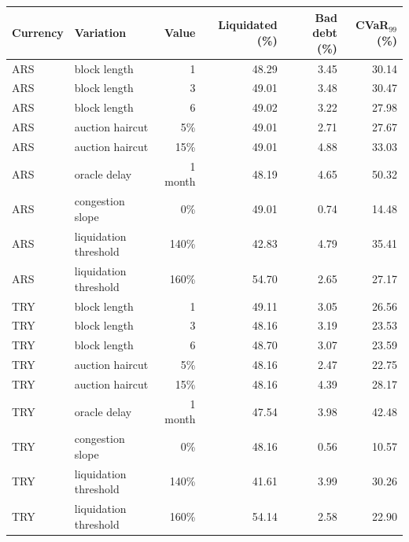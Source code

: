 \begin{tabular}{llrrrr}
\toprule
Currency & Variation & Value & Liquidated (\%) & Bad debt (\%) & CVaR$_{99}$ (\%) \\
\midrule
ARS & block length & 1 & 48.29 & 3.45 & 30.14 \\
ARS & block length & 3 & 49.01 & 3.48 & 30.47 \\
ARS & block length & 6 & 49.02 & 3.22 & 27.98 \\
ARS & auction haircut & 5\% & 49.01 & 2.71 & 27.67 \\
ARS & auction haircut & 15\% & 49.01 & 4.88 & 33.03 \\
ARS & oracle delay & 1 month & 48.19 & 4.65 & 50.32 \\
ARS & congestion slope & 0\% & 49.01 & 0.74 & 14.48 \\
ARS & liquidation threshold & 140\% & 42.83 & 4.79 & 35.41 \\
ARS & liquidation threshold & 160\% & 54.70 & 2.65 & 27.17 \\
TRY & block length & 1 & 49.11 & 3.05 & 26.56 \\
TRY & block length & 3 & 48.16 & 3.19 & 23.53 \\
TRY & block length & 6 & 48.70 & 3.07 & 23.59 \\
TRY & auction haircut & 5\% & 48.16 & 2.47 & 22.75 \\
TRY & auction haircut & 15\% & 48.16 & 4.39 & 28.17 \\
TRY & oracle delay & 1 month & 47.54 & 3.98 & 42.48 \\
TRY & congestion slope & 0\% & 48.16 & 0.56 & 10.57 \\
TRY & liquidation threshold & 140\% & 41.61 & 3.99 & 30.26 \\
TRY & liquidation threshold & 160\% & 54.14 & 2.58 & 22.90 \\
\bottomrule
\end{tabular}
